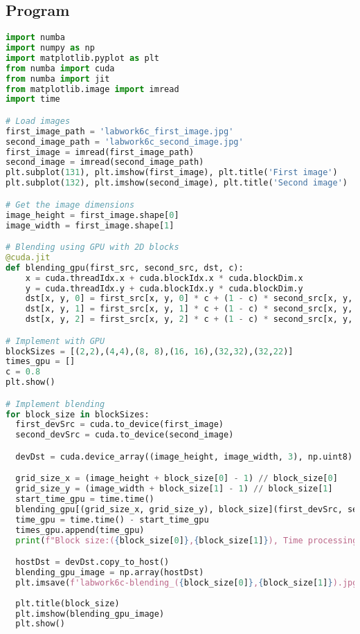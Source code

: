 \documentclass[12pt]{article}
\begin{document}
\subsection{Program}
\begin{lstlisting}[language=Python]
import numba
import numpy as np
import matplotlib.pyplot as plt
from numba import cuda
from numba import jit
from matplotlib.image import imread
import time

# Load images
first_image_path = 'labwork6c_first_image.jpg'
second_image_path = 'labwork6c_second_image.jpg'
first_image = imread(first_image_path)
second_image = imread(second_image_path)
plt.subplot(131), plt.imshow(first_image), plt.title('First image')
plt.subplot(132), plt.imshow(second_image), plt.title('Second image')

# Get the image dimensions
image_height = first_image.shape[0]
image_width = first_image.shape[1]

# Blending using GPU with 2D blocks
@cuda.jit
def blending_gpu(first_src, second_src, dst, c):
    x = cuda.threadIdx.x + cuda.blockIdx.x * cuda.blockDim.x
    y = cuda.threadIdx.y + cuda.blockIdx.y * cuda.blockDim.y
    dst[x, y, 0] = first_src[x, y, 0] * c + (1 - c) * second_src[x, y, 0]
    dst[x, y, 1] = first_src[x, y, 1] * c + (1 - c) * second_src[x, y, 1]
    dst[x, y, 2] = first_src[x, y, 2] * c + (1 - c) * second_src[x, y, 2]

# Implement with GPU
blockSizes = [(2,2),(4,4),(8, 8),(16, 16),(32,32),(32,22)]
times_gpu = []
c = 0.8
plt.show()

# Implement blending
for block_size in blockSizes:
  first_devSrc = cuda.to_device(first_image)
  second_devSrc = cuda.to_device(second_image)

  devDst = cuda.device_array((image_height, image_width, 3), np.uint8)

  grid_size_x = (image_height + block_size[0] - 1) // block_size[0]
  grid_size_y = (image_width + block_size[1] - 1) // block_size[1]
  start_time_gpu = time.time()
  blending_gpu[(grid_size_x, grid_size_y), block_size](first_devSrc, second_devSrc, devDst, c)
  time_gpu = time.time() - start_time_gpu
  times_gpu.append(time_gpu)
  print(f"Block size:({block_size[0]},{block_size[1]}), Time processing on GPU: {time_gpu}s")

  hostDst = devDst.copy_to_host()
  blending_gpu_image = np.array(hostDst)
  plt.imsave(f'labwork6c-blending_({block_size[0]},{block_size[1]}).jpg', blending_gpu_image, cmap='gray')
  
  plt.title(block_size)
  plt.imshow(blending_gpu_image)
  plt.show()
\end{lstlisting}
\end{document}
